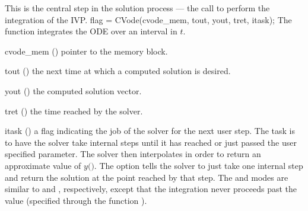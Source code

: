 This is the central step in the solution process --- the call to
perform the integration of the IVP.
%
{
  flag = CVode(cvode\_mem, tout, yout, tret, itask);
}
{
  The function  integrates the ODE over an interval in $t$.
}
{
  \begin{args}
  \item[cvode\_mem] ()
    pointer to the {\cvode} memory block.
  \item[tout] ()
    the next time at which a computed solution is desired.
  \item[yout] ()
    the computed solution vector.
  \item[tret] ()
    the time reached by the solver.
  \item[itask] ()
    a flag indicating the job of the solver for the next user step. 
    The  task is to have the solver take internal steps until   
    it has reached or just passed the user specified 
    parameter. The solver then interpolates in order to   
    return an approximate value of $y($$)$. 
    The  option tells the solver to just take one internal step  
    and return the solution at the point reached by that step. 
    The  and  modes are     
    similar to  and , respectively, except    
    that the integration never proceeds past the value      
     (specified through the function ).
  \end{args}
}
